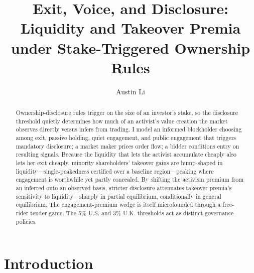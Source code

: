 \documentclass[11pt]{article}
\title{\textbf{Exit, Voice, and Disclosure:}\\[0.3em]
\large Liquidity and Takeover Premia under Stake-Triggered Ownership Rules}
\author{Austin Li\\[0.25em]}
\date{}
\newcommand{\1}{\mathbf{1}}
\begin{document}
\maketitle


\begin{abstract}
\noindent Ownership-disclosure rules trigger on the size of an investor's stake, so the disclosure threshold quietly determines how much of an activist's value creation the market observes directly versus infers from trading. I model an informed blockholder choosing among exit, passive holding, quiet engagement, and public engagement that triggers mandatory disclosure; a market maker prices order flow; a bidder conditions entry on resulting signals. Because the liquidity that lets the activist accumulate cheaply also lets her exit cheaply, minority shareholders' takeover gains are hump-shaped in liquidity---single-peakedness certified over a baseline region---peaking where engagement is worthwhile yet partly concealed. By shifting the activism premium from an inferred onto an observed basis, stricter disclosure attenuates takeover premia's sensitivity to liquidity---sharply in partial equilibrium, conditionally in general equilibrium. The engagement-premium wedge is itself microfounded through a free-rider tender game. The 5\% U.S. and 3\% U.K. thresholds act as distinct governance policies.
\end{abstract}

\newpage

\section{Introduction}
\end{document}
